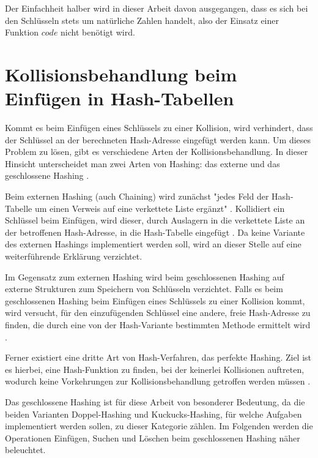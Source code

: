 Der Einfachheit halber wird in dieser Arbeit davon ausgegangen, dass es sich bei den Schlüsseln stets um natürliche Zahlen handelt, also der Einsatz einer Funktion \(code\) nicht benötigt wird.

\section{Kollisionsbehandlung beim Einfügen in Hash-Tabellen}
Kommt es beim Einfügen eines Schlüssels zu einer Kollision, wird verhindert, dass der Schlüssel an der berechneten Hash-Adresse eingefügt werden kann. Um dieses Problem zu lösen, gibt es verschiedene Arten der Kollisionsbehandlung. In dieser Hinsicht unterscheidet man zwei Arten von Hashing: das externe und das geschlossene Hashing \cite[S.~239 ff.]{ADSWeiWei}.

Beim externen Hashing (auch Chaining) wird zunächst "jedes Feld der Hash-Tabelle um einen Verweis auf eine verkettete Liste ergänzt" \cite[S.~239]{ADSWeiWei}. Kollidiert ein Schlüssel beim Einfügen, wird dieser, durch Auslagern in die verkettete Liste an der betroffenen Hash-Adresse, in die Hash-Tabelle eingefügt \cite[S.~239]{ADSWeiWei}. Da keine Variante des externen Hashings implementiert werden soll, wird an dieser Stelle auf eine weiterführende Erklärung verzichtet. 

Im Gegensatz zum externen Hashing wird beim geschlossenen Hashing auf externe Strukturen zum Speichern von Schlüsseln verzichtet. Falls es beim geschlossenen Hashing beim Einfügen eines Schlüssels zu einer Kollision kommt, wird versucht, für den einzufügenden Schlüssel eine andere, freie Hash-Adresse zu finden, die durch eine von der Hash-Variante bestimmten Methode ermittelt wird \cite[S.~203]{ADSOttWid}. 

Ferner existiert eine dritte Art von Hash-Verfahren, das perfekte Hashing. Ziel ist es hierbei, eine Hash-Funktion zu finden, bei der keinerlei Kollisionen auftreten, wodurch keine Vorkehrungen zur Kollisionsbehandlung getroffen werden müssen \cite[S.~195]{ADSOttWid}. 

Das geschlossene Hashing ist für diese Arbeit von besonderer Bedeutung, da die beiden Varianten Doppel-Hashing und Kuckucks-Hashing, für welche Aufgaben implementiert werden sollen, zu dieser Kategorie zählen. Im Folgenden werden die Operationen Einfügen, Suchen und Löschen beim geschlossenen Hashing näher beleuchtet.

